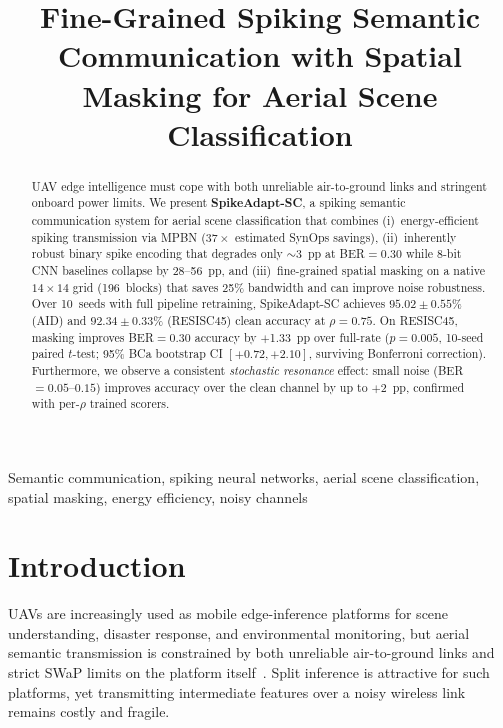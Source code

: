 \documentclass[conference]{IEEEtran}
\begin{document}
\title{Fine-Grained Spiking Semantic Communication with Spatial Masking for Aerial Scene Classification}

\author{
}

\maketitle

\begin{abstract}
UAV edge intelligence must cope with both unreliable air-to-ground links and stringent onboard power limits. We present \textbf{SpikeAdapt-SC}, a spiking semantic communication system for aerial scene classification that combines (i)~energy-efficient spiking transmission via MPBN ($37{\times}$ estimated SynOps savings), (ii)~inherently robust binary spike encoding that degrades only $\sim$3~pp at BER$=0.30$ while 8-bit CNN baselines collapse by 28--56~pp, and (iii)~fine-grained spatial masking on a native $14\times14$ grid (196~blocks) that saves 25\% bandwidth and can improve noise robustness. Over 10~seeds with full pipeline retraining, SpikeAdapt-SC achieves $95.02{\pm}0.55$\% (AID) and $92.34{\pm}0.33$\% (RESISC45) clean accuracy at $\rho{=}0.75$. On RESISC45, masking improves BER$=0.30$ accuracy by $+$1.33~pp over full-rate ($p{=}0.005$, 10-seed paired $t$-test; 95\% BCa bootstrap CI $[+0.72, +2.10]$, surviving Bonferroni correction). Furthermore, we observe a consistent \emph{stochastic resonance} effect: small noise (BER$=0.05$--$0.15$) improves accuracy over the clean channel by up to $+$2~pp, confirmed with per-$\rho$ trained scorers.
\end{abstract}

\begin{IEEEkeywords}
Semantic communication, spiking neural networks, aerial scene classification, spatial masking, energy efficiency, noisy channels
\end{IEEEkeywords}

\section{Introduction}
\label{sec:intro}

UAVs are increasingly used as mobile edge-inference platforms for scene understanding, disaster response, and environmental monitoring, but aerial semantic transmission is constrained by both unreliable air-to-ground links and strict SWaP limits on the platform itself~\cite{zeng2019uav, li2021survey, khuwaja2018survey}. Split inference is attractive for such platforms, yet transmitting intermediate features over a noisy wireless link remains costly and fragile.
\end{document}
